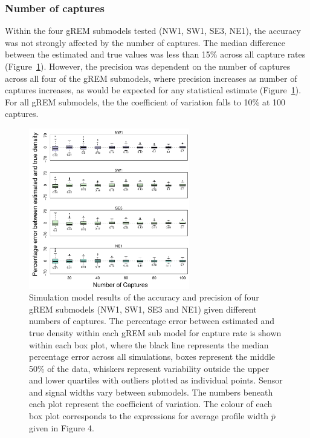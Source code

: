 \subsubsection{Number of captures}

Within the four gREM submodels tested (NW1, SW1, SE3, NE1), the accuracy was not strongly affected by the number of captures.
The median difference between the estimated and true values was less than 15\% across all capture rates (Figure~\ref{f:Captures}).
However, the precision was dependent on the number of captures across all four of the gREM submodels, where precision increases as number of captures increases, as would be expected for any statistical estimate (Figure~\ref{f:Captures}).
For all gREM submodels, the the coefficient of variation falls to 10\% at 100 captures. 

\begin{figure}[t]
  \centering
	\includegraphics[width=7cm]{imgs/lucas_et_al_figure6.pdf}
\caption[Simulation model results of the accuracy and precision of four gREM submodels]{
Simulation model results of the accuracy and precision of four gREM submodels (NW1, SW1, SE3 and NE1) given different numbers of captures.
The percentage error between estimated and true density within each gREM sub model for capture rate is shown within each box plot, where the black line represents the median percentage error across all simulations, boxes represent the middle 50\% of the data, whiskers represent variability outside the upper and lower quartiles with outliers plotted as individual points.
Sensor and signal widths vary between submodels.
The numbers beneath each plot represent the coefficient of variation.
The colour of each box plot corresponds to the expressions for average profile width $\bar{p}$ given in Figure 4. }            
\label{f:Captures}
\end{figure}


